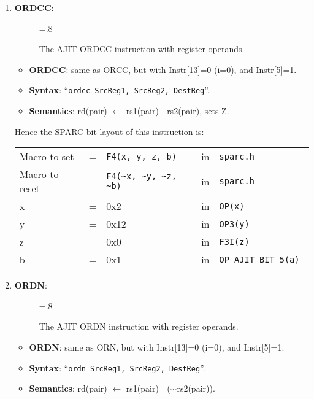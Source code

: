 \begin{enumerate}
\item \textbf{ORDCC}:\\
  \begin{center}
    \begin{figure}[h]
      \centering
      \epsfxsize=.8\linewidth
      \caption{The AJIT ORDCC instruction  with register operands.}
      \label{fig:ajit:ordcc:insn}
    \end{figure}
  \end{center}
  \begin{itemize}
  \item []\textbf{ORDCC}: same as ORCC, but with Instr[13]=0 (i=0), and
    Instr[5]=1.
  \item []\textbf{Syntax}: ``\texttt{ordcc  SrcReg1, SrcReg2, DestReg}''.
  \item []\textbf{Semantics}: rd(pair) $\leftarrow$ rs1(pair) $\vert$
    rs2(pair), sets Z.
  \end{itemize}

  Hence the SPARC bit layout of this instruction is:

  \begin{tabular}[h]{lclcl}
    Macro to set   &=&  \verb|F4(x, y, z, b)|     &in& \verb|sparc.h|     \\
    Macro to reset &=&  \verb|F4(~x, ~y, ~z, ~b)| &in& \verb|sparc.h|     \\
    x              &=& 0x2                        &in& \verb|OP(x) | \\
    y              &=& 0x12                       &in& \verb|OP3(y) | \\
    z              &=& 0x0                        &in& \verb|F3I(z) | \\
    b              &=& 0x1                        &in& \verb|OP_AJIT_BIT_5(a) |
  \end{tabular}

\item \textbf{ORDN}:\\
  \begin{center}
    \begin{figure}[h]
      \centering
      \epsfxsize=.8\linewidth
      \caption{The AJIT ORDN instruction  with register operands.}
      \label{fig:ajit:ordn:insn}
    \end{figure}
  \end{center}
  \begin{itemize}
  \item []\textbf{ORDN}: same as ORN, but with Instr[13]=0 (i=0), and
    Instr[5]=1.
  \item []\textbf{Syntax}: ``\texttt{ordn  SrcReg1, SrcReg2, DestReg}''.
  \item []\textbf{Semantics}: rd(pair) $\leftarrow$ rs1(pair) $\vert$ ($\sim$rs2(pair)).
  \end{itemize}


\end{enumerate}
